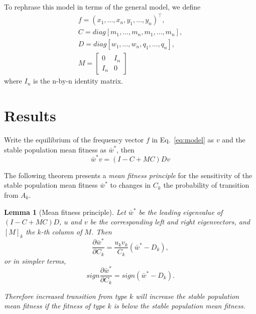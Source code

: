 \documentclass[9pt, a4paper, twocolumn]{extarticle}
\newcommand*{\tr}{^\intercal}
\newtheorem{lemma}{Lemma}
\begin{document}
To rephrase this model in terms of the general model, we define
\begin{equation}
\begin{aligned}
f = (x_1, \ldots, x_n, y_1, \ldots, y_n)\tr, \\
C = diag[m_1, \ldots, m_n, m_1, \ldots, m_n], \\
D = diag[w_1, \ldots, w_n, q_1, \ldots, q_n], \\
M = \begin{bmatrix}
0 & I_n \\
I_n & 0
\end{bmatrix}
\end{aligned}
\end{equation}
where $I_n$ is the n-by-n identity matrix.

\section*{Results}

Write the equilibrium of the frequency vector $f$ in Eq.~\ref{eq:model} as $v$ and the stable population mean fitness as $\bar{w}^*$, then
\begin{equation}\label{eq:model_equilibrium}
\bar{w}^* v = (I-C+MC)D v
\end{equation}

The following theorem presents a \emph{mean fitness principle} for the
sensitivity of the stable population mean fitness $\bar{w}^*$ to changes
in $C_k$ the probability of transition from $A_k$.

\begin{lemma}[Mean fitness principle]
Let $\bar{w}^*$ be the leading eigenvalue of $(I-C+MC)D$, $u$ and $v$ be the corresponding left and right eigenvectors, and $[M]_k$ the $k$-th column of $M$. Then
\begin{equation}\label{eq:theorem}
\frac{\partial \bar{w}^*}{\partial C_k} = 
\frac{u_k v_k}{C_k} (\bar{w}^* - D_k),
\end{equation}
or in simpler terms,
\begin{equation}\label{eq:sign_theorem}
sign\frac{\partial \bar{w}^*}{\partial C_k} = 
sign(\bar{w}^* - D_k).
\end{equation}

Therefore increased transition from type $k$ will increase the stable population mean fitness if the fitness of type $k$ is below the stable population mean fitness.
\end{lemma}
\end{document}
